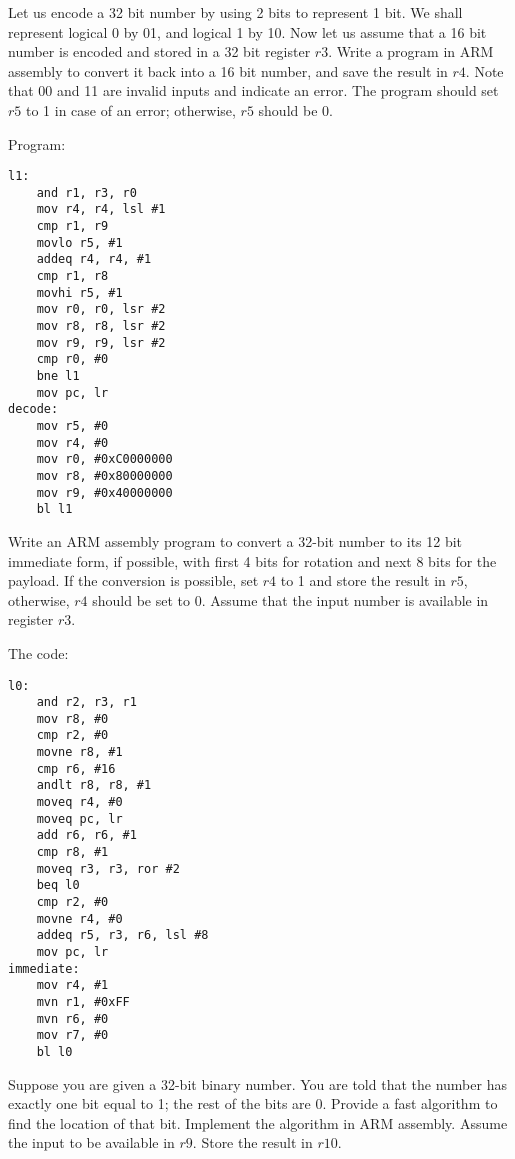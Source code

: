 \begin{ExerciseList}
\Exercise[difficulty=1]
Let us encode a 32 bit number by using 2 bits to represent 1 bit. We shall represent logical 0 by 
01, and logical 1 by 10. 
Now let us assume that a 16 bit number 
is encoded and stored in a 32 bit register $r3$. 
Write a program in ARM assembly to convert it back into a 16 bit number, and save the result in $r4$. 
Note that 00 and 11 are invalid inputs and
indicate an error. The program should set $r5$ to 1 in case of an error; otherwise, $r5$ should be 0.

\Answer Program:
\begin{Verbatim}[frame=single]
l1:
	and r1, r3, r0
	mov r4, r4, lsl #1
	cmp r1, r9
	movlo r5, #1
	addeq r4, r4, #1
	cmp r1, r8
	movhi r5, #1
	mov r0, r0, lsr #2
	mov r8, r8, lsr #2
	mov r9, r9, lsr #2
	cmp r0, #0
	bne l1
	mov pc, lr
decode:
	mov r5, #0
	mov r4, #0
	mov r0, #0xC0000000
	mov r8, #0x80000000
	mov r9, #0x40000000
	bl l1
\end{Verbatim}



\Exercise[difficulty=2]
Write an ARM assembly program to convert a 32-bit number to its 12 bit immediate form, 
if possible, with first 4 bits for rotation and next 8 bits for the payload. 
If the conversion is possible, set $r4$ to 1 and store the result in $r5$, 
otherwise, $r4$ should be set to 0. Assume that the input number is available in register $r3$.

\Answer The code:
\begin{Verbatim}[frame=single]
l0:
	and r2, r3, r1
	mov r8, #0
	cmp r2, #0
	movne r8, #1
	cmp r6, #16
	andlt r8, r8, #1
	moveq r4, #0
	moveq pc, lr
	add r6, r6, #1
	cmp r8, #1
	moveq r3, r3, ror #2
	beq l0	
	cmp r2, #0
	movne r4, #0
	addeq r5, r3, r6, lsl #8
	mov pc, lr
immediate:
	mov r4, #1
	mvn r1, #0xFF
	mvn r6, #0
	mov r7, #0
	bl l0
\end{Verbatim}





\Exercise[difficulty=2]
Suppose you are given a 32-bit binary number. You are told that the number has exactly one bit equal to 1;
the rest of the bits are 0. Provide a fast algorithm to find the location of that bit. 
Implement the algorithm in ARM assembly. Assume the input to be available in $r9$. 
Store the result in $r10$.


\end{ExerciseList}
